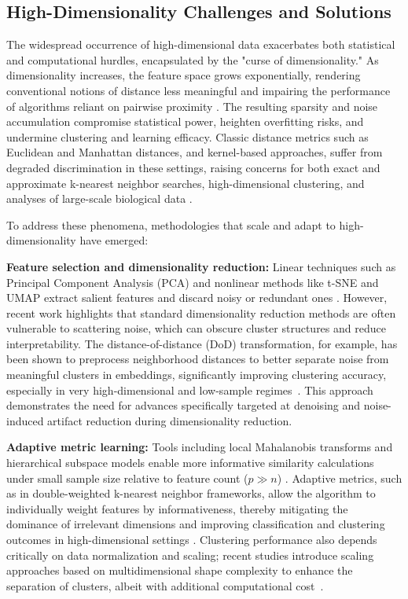 \documentclass[sigconf]{acmart}
\begin{document}
\subsection{High-Dimensionality Challenges and Solutions}

The widespread occurrence of high-dimensional data exacerbates both statistical and computational hurdles, encapsulated by the "curse of dimensionality." As dimensionality increases, the feature space grows exponentially, rendering conventional notions of distance less meaningful and impairing the performance of algorithms reliant on pairwise proximity \cite{ref64,ref65}. The resulting sparsity and noise accumulation compromise statistical power, heighten overfitting risks, and undermine clustering and learning efficacy. Classic distance metrics such as Euclidean and Manhattan distances, and kernel-based approaches, suffer from degraded discrimination in these settings, raising concerns for both exact and approximate k-nearest neighbor searches, high-dimensional clustering, and analyses of large-scale biological data \cite{ref72,ref73,ref93,ref110,ref116}.

To address these phenomena, methodologies that scale and adapt to high-dimensionality have emerged:

\textbf{Feature selection and dimensionality reduction:} Linear techniques such as Principal Component Analysis (PCA) and nonlinear methods like t-SNE and UMAP extract salient features and discard noisy or redundant ones \cite{ref92,ref97,ref101}. However, recent work highlights that standard dimensionality reduction methods are often vulnerable to scattering noise, which can obscure cluster structures and reduce interpretability. The distance-of-distance (DoD) transformation, for example, has been shown to preprocess neighborhood distances to better separate noise from meaningful clusters in embeddings, significantly improving clustering accuracy, especially in very high-dimensional and low-sample regimes~\cite{ref101}. This approach demonstrates the need for advances specifically targeted at denoising and noise-induced artifact reduction during dimensionality reduction.

\textbf{Adaptive metric learning:} Tools including local Mahalanobis transforms and hierarchical subspace models enable more informative similarity calculations under small sample size relative to feature count ($p \gg n$) \cite{ref64,ref92,ref93}. Adaptive metrics, such as in double-weighted k-nearest neighbor frameworks, allow the algorithm to individually weight features by informativeness, thereby mitigating the dominance of irrelevant dimensions and improving classification and clustering outcomes in high-dimensional settings \cite{ref72}. Clustering performance also depends critically on data normalization and scaling; recent studies introduce scaling approaches based on multidimensional shape complexity to enhance the separation of clusters, albeit with additional computational cost~\cite{ref65}.
\end{document}
